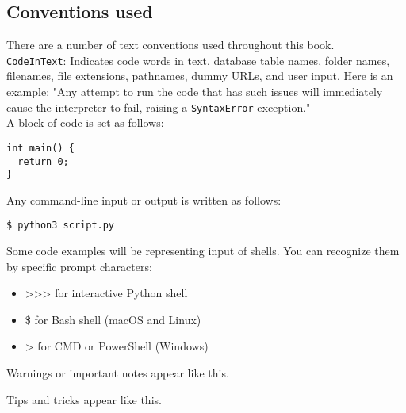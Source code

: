 \begin{FlushLeft}
\section*{Conventions used}
There are a number of text conventions used throughout this book.\\



\texttt{CodeInText}: Indicates code words in text, database table names, folder
names, filenames, file extensions, pathnames, dummy URLs, and user input. Here
is an example: "Any attempt to run the code that has such issues will
immediately cause the interpreter to fail, raising a \texttt{SyntaxError}
exception."\\ 

A block of code is set as follows:
\begin{verbatim}
int main() {
  return 0;
}
\end{verbatim}


Any command-line input or output is written as follows:
\begin{adjustwidth}{0em}{0em}
\begin{verbatim}
$ python3 script.py
\end{verbatim}
\end{adjustwidth}

Some code examples will be representing input of shells. You can recognize them by specific prompt characters:
\begin{itemize}[nosep]
    \item >>> for interactive Python shell
    \item \$ for Bash shell (macOS and Linux)
    \item > for CMD or PowerShell (Windows)
\end{itemize}

\newpage

Warnings or important notes appear like this.
\begin{center}
\noindent{}
\end{center}

Tips and tricks appear like this.
\begin{center}
\noindent{}
\end{center}


\end{FlushLeft}
